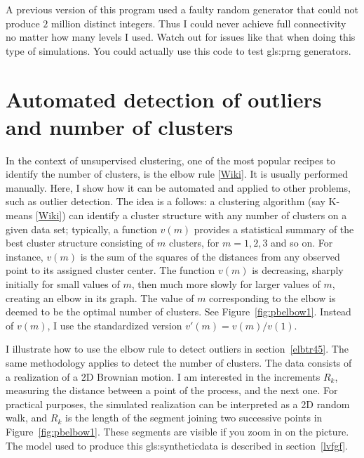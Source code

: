 \documentclass[oneside,10pt]{book}
\begin{document}
\noindent A previous version of this program used a faulty random generator that could not produce $2$ million distinct integers. 
Thus I could never achieve full connectivity no matter how many levels I used. Watch out for issues like that when doing this type of simulations. You could actually use
 this code to test \gls{gls:prng} generators.


\section{Automated detection of outliers and number of clusters}\label{bbcl}

In the context of unsupervised clustering, one of the most popular recipes to identify the number of clusters, is the 
\textcolor{index}{elbow rule} [\href{https://en.wikipedia.org/wiki/Elbow_method_(clustering)}{Wiki}]. It is usually performed manually. Here, I show how it can be automated and applied to other problems, such as outlier detection. The idea is a follows: a clustering algorithm (say K-means 
[\href{https://en.wikipedia.org/wiki/K-means_clustering}{Wiki}]) can identify a cluster structure with any number of clusters on a given data set; typically, a function $v(m)$ provides a statistical summary of the best cluster structure consisting of $m$ clusters, for $m=1,2,3$ and so on. For instance, $v(m)$ is the sum of the squares of the distances from any observed point to its assigned cluster center.
The function $v(m)$ is decreasing, sharply initially for small values of $m$, then much more slowly for larger values of $m$, creating an elbow in its graph.  The value of $m$ corresponding to the elbow is deemed to be the optimal number of clusters. See Figure~\ref{fig:pbelbow1}. Instead of $v(m)$, I use the standardized version $v'(m)=v(m)/v(1)$. 

I illustrate how to use the elbow rule to detect \textcolor{index}{outliers} in section~\ref{elbtr45}. The same methodology applies to detect the number of clusters. 
 The data consists of a realization of a 2D Brownian motion. I am interested in the increments $R_k$, measuring the distance between
 a point of the process, and the next one. For practical purposes, the simulated realization can be interpreted as a 2D random walk, and $R_k$ is the length of the segment joining two successive points in Figure~\ref{fig:pbelbow1}. These segments are visible if you zoom in on the picture. The model used to produce this \gls{gls:syntheticdata} is described in section~\ref{lvfgf}.
\end{document}
